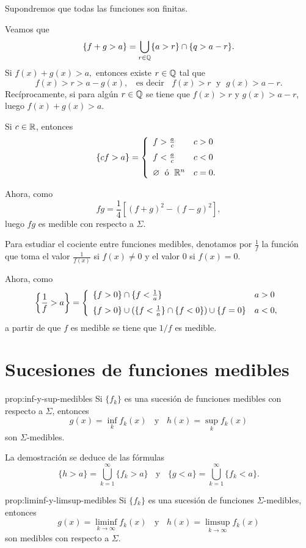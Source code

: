 \begin{demo}
Supondremos que todas las funciones son finitas.

Veamos que 
\[
\{
f+g>a\}=\bigcup\limits_{r \in \mathbb{Q}} \{ a>r\} \cap \{q>a-r\}.
\]
Si $f(x)+g(x)>a,$ entonces existe $r \in \mathbb{Q}$ tal que 
\[
f(x)>r>a-g(x),\;\;\mbox{ es decir }\;\; 
f(x)>r\;\mbox{ y }\; g(x)>a-r.
\]
Rec\'iprocamente, si para alg\'un $r\in \mathbb{Q}$ se tiene que $f(x)>r$ y $g(x)>a-r$, luego $f(x)+g(x)>a$.

Si $c\in \mathbb{R}$, entonces
\[
\{cf>a\}=
\left\{
\begin{array}{ll}
f>\frac{a}{c}&c>0
\medskip
\\
f<\frac{a}{c}&c<0
\medskip
\\
\emptyset\;\mbox{ \'o }\;\rr^n &c=0.
\end{array}
\right.
\]

Ahora, como 
\[
fg=\frac{1}{4}\left[(f+g)^2-(f-g)^2\right],
\]
luego $fg$ es medible con respecto a $\Sigma$. 

Para estudiar el cociente entre funciones medibles, denotamos por $\frac{1}{f}$
la funci\'on que toma el valor $\frac{1}{f(x)}$ si $f(x)\neq 0$ y el valor $0$ si $f(x)=0$.

Ahora, como 
\[
\left\{\frac{1}{f}>a\right\}
=
\left \{
\begin{array}{ll}
 \{f>0\} \cap \{f<\frac{1}{a}\}    &  a>0 
 \medskip
 \\
 \{ f>0\} \cup  (\{f<\frac{1}{a}\} \cap \{f<0\}) \cup \{f=0\}
     & a<0, 
\end{array}
\right.
\]
a partir de que $f$ es medible se tiene que  $1/f$ es medible. 
\end{demo}

\section{Sucesiones de funciones medibles}

\begin{proposicion}{prop:inf-y-sup-medibles}
Si $\{f_k\}$ es una sucesi\'on de funciones medibles con respecto a $\Sigma$, 
entonces
\[
g(x)=\inf\limits_{k} f_k(x) \;\;\mbox{ y }\;\; h(x)=\sup\limits_{k} f_k(x) 
\]
son $\Sigma$-medibles. 
\end{proposicion}


La demostraci\'on se deduce de las f\'ormulas
\[
\{h>a \}=\bigcup_{k=1}^{\infty} \{f_k>a\}
\;\;\mbox{ y }\;\;
\{g<a \}=\bigcup_{k=1}^{\infty} \{f_k<a\}.
\]

\begin{proposicion}{prop:liminf-y-limsup-medibles}
Si $\{f_k\}$ es una sucesi\'on de funciones $\Sigma$-medibles, entonces
\[
g(x)=\liminf\limits_{k \to \infty} f_k(x)
\;\;\mbox{ y }
\;\;
h(x)=\limsup\limits_{k \to \infty} f_k(x)
\]
son   medibles con respecto a $\Sigma$.
\end{proposicion}


